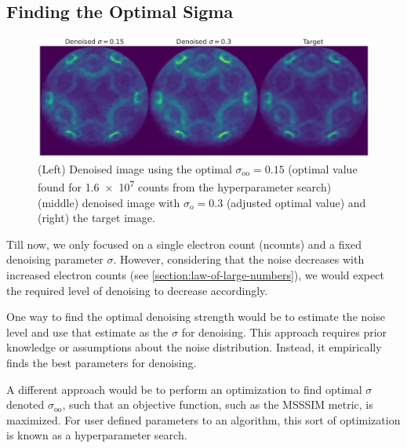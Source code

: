 \subsection{Finding the Optimal Sigma}\label{section:finding-optimal-sigma}
\begin{figure}
    \centering
    \includegraphics[width=1\linewidth]{images/denoised_optimal_sigma.pdf}
    \caption{(Left) Denoised image using the optimal $\sigma_{\text{oo}}=0.15$ (optimal value found for \num{1.6e7} counts from the hyperparameter search) (middle) denoised image with $\sigma_{\text{o}}=0.3$ (adjusted optimal value) and (right) the target image.}
    \label{fig:denoised-optimal-sigma}
\end{figure}
Till now, we only focused on a single electron count (\gls{ncounts}) and a fixed denoising parameter $\sigma$. However, considering that the noise decreases with increased electron counts (see \cref{section:law-of-large-numbers}), we would expect the required level of denoising to decrease accordingly.


One way to find the optimal denoising strength would be to estimate the noise level and use that estimate as the $\sigma$ for denoising. This approach requires prior knowledge or assumptions about the noise distribution. Instead, it empirically finds the best parameters for denoising.

A different approach would be to perform an  optimization to find optimal $\sigma$ denoted $\sigma_{\text{oo}}$, such that an objective function, such as the \gls{MSSSIM} metric, is maximized. For user defined parameters to an algorithm, this sort of optimization is known as a hyperparameter search. 

